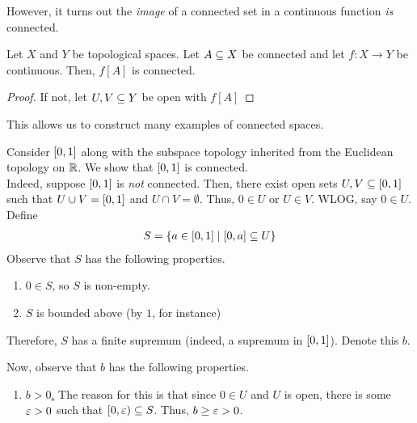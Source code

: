 However, it turns out the \textit{image} of a connected set in a continuous function \textit{is} connected.

\begin{boxlemma}
    Let $X$ and $Y$ be topological spaces. Let $A \subseteq X$ be connected and let $f : X \to Y$ be continuous. Then, $f[A]$ is connected.
\end{boxlemma}
\begin{proof}
    If not, let $U, V \subseteq Y$ be open with $f[A]$ \sorry
\end{proof}

This allows us to construct many examples of connected spaces.

\begin{boxexample}
    Consider $\left[ 0, 1 \right]$ along with the subspace topology inherited from the Euclidean topology on $\mathbb{R}$. We show that $\left[ 0, 1 \right]$ is connected. \\
    
    Indeed, suppose $\left[ 0, 1 \right]$ is \textit{not} connected. Then, there exist open sets $U, V \subseteq \left[ 0, 1 \right]$ such that $U \cup V = \left[ 0, 1 \right]$ and $U \cap V = \emptyset$. Thus, $0 \in U$ or $U \in V$. WLOG, say $0 \in U$. Define
    \begin{align*}
        S = \left\{ a \in \left[ 0, 1 \right] \; \middle\vert \; \left[ 0, a \right] \subseteq U \right\}
    \end{align*}
    Observe that $S$ has the following properties.
    \begin{enumerate}
        \item $0 \in S$, so $S$ is non-empty.
        \item $S$ is bounded above (by $1$, for instance)
    \end{enumerate}
    Therefore, $S$ has a finite supremum (indeed, a supremum in $\left[ 0, 1 \right]$). Denote this $b$.
    \begin{figure}[H]
        \centering
    \end{figure}
    Now, observe that $b$ has the following properties.
    \begin{enumerate}
        \item \underline{$b > 0$.} The reason for this is that since $0 \in U$ and $U$ is open, there is some $\varepsilon > 0$ such that $\left[0, \varepsilon\right) \subseteq S$. Thus, $b \geq \varepsilon > 0$.


\end{enumerate}
\end{boxexample}
